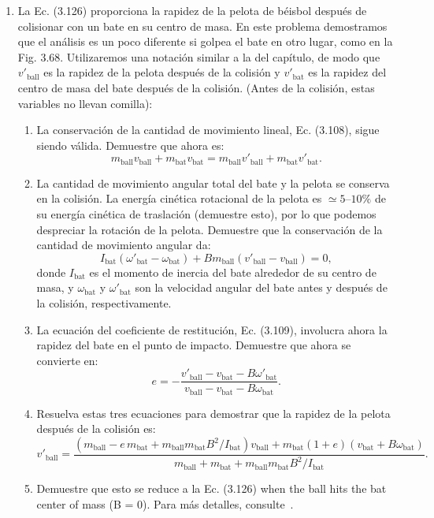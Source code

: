 \documentclass[12pt]{book}
\begin{document}
\begin{enumerate}
\item[3.165] La Ec. (3.126) proporciona la rapidez de la pelota de béisbol después de colisionar con un bate en su centro de masa. En este problema demostramos que el análisis es un poco diferente si golpea el bate en otro lugar, como en la Fig. 3.68. Utilizaremos una notación similar a la del capítulo, de modo que $v'_{\text{ball}}$ es la rapidez de la pelota después de la colisión y $v'_{\text{bat}}$ es la rapidez del centro de masa del bate después de la colisión. (Antes de la colisión, estas variables no llevan comilla):
\begin{enumerate}
\item[(a)] La conservación de la cantidad de movimiento lineal, Ec. (3.108), sigue siendo válida. Demuestre que ahora es:
\begin{equation}
m_{\text{ball}} v_{\text{ball}} + m_{\text{bat}} v_{\text{bat}} = m_{\text{ball}} v'_{\text{ball}} + m_{\text{bat}} v'_{\text{bat}}.
\label{eq:3.165}
\end{equation}
\item[(b)] La cantidad de movimiento angular total del bate y la pelota se conserva en la colisión. La energía cinética rotacional de la pelota es $\simeq 5\text{--}10\%$ de su energía cinética de traslación (demuestre esto), por lo que podemos despreciar la rotación de la pelota. Demuestre que la conservación de la cantidad de movimiento angular da:
\begin{equation}
I_{\text{bat}}(\omega'_{\text{bat}} - \omega_{\text{bat}}) + B m_{\text{ball}}(v'_{\text{ball}} - v_{\text{ball}}) = 0,
\label{eq:3.166}
\end{equation}
donde $I_{\text{bat}}$ es el momento de inercia del bate alrededor de su centro de masa, y $\omega_{\text{bat}}$ y $\omega'_{\text{bat}}$ son la velocidad angular del bate antes y después de la colisión, respectivamente.
\item[(c)] La ecuación del coeficiente de restitución, Ec. (3.109), involucra ahora la rapidez del bate en el punto de impacto. Demuestre que ahora se convierte en:
\begin{equation}
e = -\frac{v'_{\text{ball}} - v_{\text{bat}} - B \omega'_{\text{bat}}}{v_{\text{ball}} - v_{\text{bat}} - B \omega_{\text{bat}}}.
\label{eq:3.167}
\end{equation}
\item[(d)] Resuelva estas tres ecuaciones para demostrar que la rapidez de la pelota después de la colisión es:
\begin{equation}
v'_{\text{ball}} = \frac{(m_{\text{ball}} - e\,m_{\text{bat}} + m_{\text{ball}} m_{\text{bat}} B^2/I_{\text{bat}}) v_{\text{ball}} + m_{\text{bat}}(1 + e)(v_{\text{bat}} + B\omega_{\text{bat}})}{m_{\text{ball}} + m_{\text{bat}} + m_{\text{ball}} m_{\text{bat}} B^2/I_{\text{bat}}}.
\label{eq:3.168}
\end{equation}
\item[(e)] Demuestre que esto se reduce a la Ec. (3.126) when the ball hits the bat center of mass (B = 0). Para más detalles, consulte~\cite{ref17,ref18,ref137}.
\end{enumerate}


\end{enumerate}
\end{document}
